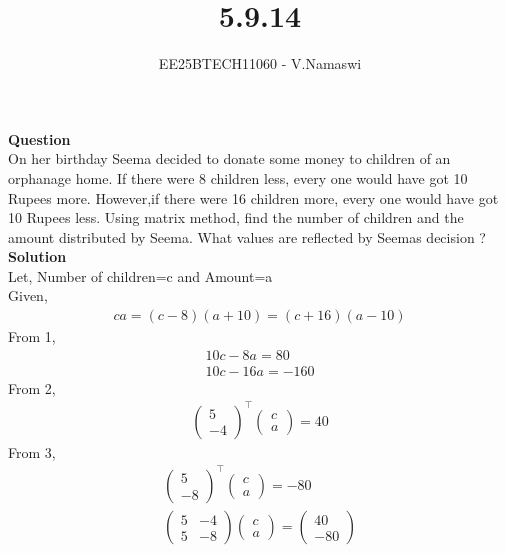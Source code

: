 \documentclass[journal]{IEEEtran}
\begin{document}

\vspace{3cm}

\title{5.9.14}
\author{EE25BTECH11060 - V.Namaswi}
{\let\newpage\relax\maketitle}
\renewcommand{\thefigure}{\theenumi}
\renewcommand{\thetable}{\theenumi}
\setlength{\intextsep}{10pt} %
\textbf{Question}\\ On her birthday Seema decided to donate some money to children of an orphanage home. If there were 8 children less, every one would have got  10 Rupees more. However,if there were 16 children more, every one would have got  10 Rupees less. Using matrix method, find the number of children and the amount distributed by Seema. What values are reflected by Seemas decision ?\\
\textbf{Solution}\\
Let, Number of children=c and Amount=a\\
Given,\\
\begin{align}
   ca=(c-8)(a+10)=(c+16)(a-10) 
\end{align}
From 1,
\begin{align}
    10c-8a=80\\
    10c-16a=-160
\end{align}
   From 2,
\begin{align}
    \begin{pmatrix}
        5 \\ -4
    \end{pmatrix}^\top \begin{pmatrix}
        c \\ a
    \end{pmatrix}=40
    \end{align}
    From 3,
\begin{align}
    \begin{pmatrix}
     5  \\ -8   
    \end{pmatrix}^\top \begin{pmatrix}
        c \\ a
    \end{pmatrix}=-80\\
    \begin{pmatrix}
        5 & -4 \\
        5 & -8
    \end{pmatrix}\begin{pmatrix}
        c \\ a
    \end{pmatrix}=\begin{pmatrix}
        40 \\ -80
    \end{pmatrix}
\end{align} 
 
\end{document}
